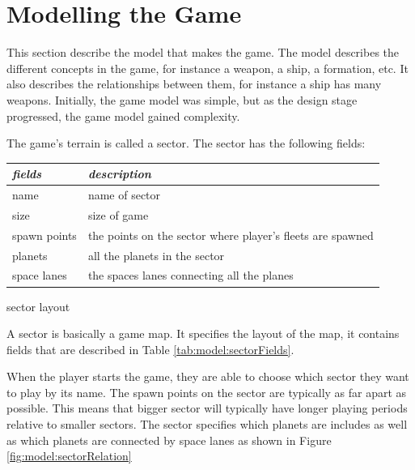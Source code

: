 \section{Modelling the Game}

% 

This section describe the model that makes the game.
The model describes the different concepts in the game, for instance a weapon, a ship, a formation, etc.
It also describes the relationships between them, for instance a ship has many weapons.
Initially, the game model was simple, but as the design stage progressed, the game model gained complexity.

The game's terrain is called a sector. The sector has the following fields:
\begin{margintable}
    \begin{tabular}{p{4em} p{11em}}
    \toprule
    \emph{fields} & \emph{description} \\
    \midrule

    name & name of sector \\
    size & size of game \\
    spawn points & the points on the sector where player's fleets are spawned \\
    planets & all the planets in the sector \\
    space lanes & the spaces lanes connecting all the planes \\

    \bottomrule
    \end{tabular}
    	\vspace{1em}
	\caption{sector layout}
	\label{tab:model:sectorFields}
\end{margintable}

A sector is basically a game map.
It specifies the layout of the map, it contains fields that are described in Table \ref{tab:model:sectorFields}.

When the player starts the game, they are able to choose which sector they want to play by its name. 
The spawn points on the sector are typically as far apart as possible. 
This means that bigger sector will typically have longer playing periods relative to smaller sectors.
The sector specifies which planets are includes as well as which planets are connected by space lanes as shown in Figure \ref{fig:model:sectorRelation}

